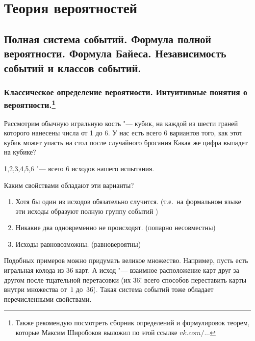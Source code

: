 \part{Теория вероятностей}

\chapter{Полная система событий. Формула полной вероятности. Формула Байеса. Независимость событий и классов событий.}

\section[Классическое определение вероятности. Интуитивные понятия о вероятности.]{Классическое определение вероятности. Интуитивные понятия о вероятности.\protect\footnote{Также рекомендую посмотреть сборник определений и формулировок теорем, которые Максим Широбоков выложил по этой ссылке \href{https://vk.com/wall5284431_976}{$vk.com/...$}}}

Рассмотрим обычную игральную кость "--- кубик, на каждой из шести граней которого нанесены числа от 1 до 6. У нас есть всего 6 вариантов того, как этот кубик может упасть на стол после случайного бросания Какая же цифра выпадет на кубике? 
\begin{center}
1,2,3,4,5,6 "--- всего 6 исходов нашего испытания.
\end{center}
Каким свойствами обладают эти варианты?
\begin{enumerate}
\item Хотя бы один из исходов обязательно случится. (т.е.~на формальном языке эти исходы образуют полную группу событий )
\item Никакие два одновременно не происходят. (попарно несовместны)
\item Исходы равновозможны. (равновероятны)
\end{enumerate}

Подобных примеров можно придумать великое множество. Например, пусть есть игральная колода из $36$ карт. А исход "--- взаимное расположение карт друг за другом после тщательной перетасовки (их $36!$ всего способов переставить карты внутри множества от~$1$ до~$36$). Такая система событий тоже обладает перечисленными свойствами.

